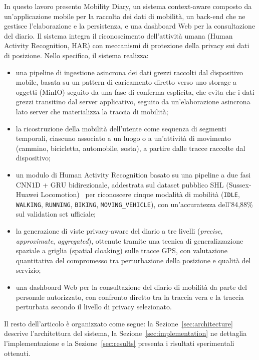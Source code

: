 \documentclass[conference]{IEEEtran}
\begin{document}
In questo lavoro presento Mobility Diary, un sistema context-aware
composto da un'applicazione mobile per la raccolta dei dati di
mobilità, un back-end che ne gestisce l'elaborazione e la persistenza,
e una dashboard Web per la consultazione del diario. Il sistema integra
il riconoscimento dell'attività umana (Human Activity Recognition, HAR)
con meccanismi di protezione della privacy sui dati di posizione. Nello
specifico, il sistema realizza:
\begin{itemize}
    \item una pipeline di ingestione asincrona dei dati grezzi raccolti
    dal dispositivo mobile, basata su un pattern di caricamento diretto
    verso uno storage a oggetti (MinIO) seguito da una fase di
    conferma esplicita, che evita che i dati grezzi transitino dal server
    applicativo, seguito da un'elaborazione asincrona lato server che
    materializza la traccia di mobilità;
    \item la ricostruzione della mobilità dell'utente come sequenza di
    segmenti temporali, ciascuno associato a un luogo o a un'attività di
    movimento (cammino, bicicletta, automobile, sosta), a partire dalle
    tracce raccolte dal dispositivo;
    \item un modulo di Human Activity Recognition basato su una pipeline
    a due fasi CNN1D + GRU bidirezionale, addestrata sul dataset
    pubblico SHL (Sussex-Huawei Locomotion)~\cite{wang2018shl} per riconoscere cinque
    modalità di mobilità (\texttt{IDLE}, \texttt{WALKING}, \texttt{RUNNING},
    \texttt{BIKING}, \texttt{MOVING\_VEHICLE}), con un'accuratezza dell'84,88\%
    sul validation set ufficiale;
    \item la generazione di viste privacy-aware del diario a tre livelli
    (\emph{precise}, \emph{approximate}, \emph{aggregated}), ottenute
    tramite una tecnica di generalizzazione spaziale a griglia (spatial
    cloaking) sulle tracce GPS, con valutazione quantitativa del
    compromesso tra perturbazione della posizione e qualità del servizio;
    \item una dashboard Web per la consultazione del diario di mobilità
    da parte del personale autorizzato, con confronto diretto tra la
    traccia vera e la traccia perturbata secondo il livello di privacy
    selezionato.
\end{itemize}

Il resto dell'articolo è organizzato come segue: la Sezione~\ref{sec:architecture}
descrive l'architettura del sistema, la Sezione~\ref{sec:implementation}
ne dettaglia l'implementazione e la Sezione~\ref{sec:results} presenta i
risultati sperimentali ottenuti.
\end{document}
